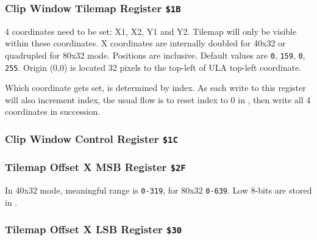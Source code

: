 \documentclass[12pt,twoside,openright,a4paper]{book}
\begin{document}
\subsubsection{Clip Window Tilemap Register {\tt \$1B}}

\begin{NextPort}
\end{NextPort}

4 coordinates need to be set: X1, X2, Y1 and Y2. Tilemap will only be visible within these coordinates. X coordinates are internally doubled for 40x32 or quadrupled for 80x32 mode. Positions are inclusive. Default values are {\tt 0}, {\tt 159}, {\tt 0}, {\tt 255}. Origin (0,0) is located 32 pixels to the top-left of ULA top-left coordinate.

Which coordinate gets set, is determined by index. As each write to this register will also increment index, the usual flow is to reset index to 0 in , then write all 4 coordinates in succession.


\subsubsection{Clip Window Control Register {\tt \$1C}}



\subsubsection{Tilemap Offset X MSB Register {\tt \$2F}}

\begin{NextPort}
\end{NextPort}

In 40x32 mode, meaningful range is {\tt 0-319}, for 80x32 {\tt 0-639}. Low 8-bits are stored in .


\subsubsection{Tilemap Offset X LSB Register {\tt \$30}}

\begin{NextPort}
\end{NextPort}
\end{document}
